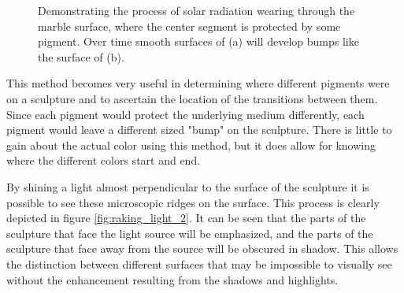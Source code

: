 \documentclass[10pt]{armath}
\begin{document}
\begin{figure}[htpb]
  \begin{center}
  \end{center}
  \caption{Demonstrating the process of solar radiation wearing through the
    marble surface, where the center segment is protected by some pigment. Over
  time smooth surfaces of (a) will develop bumps like the surface of (b).}
  \label{fig:raking_light_1}
\end{figure}

This method becomes very useful in determining where different pigments were on
a sculpture and to ascertain the location of the transitions between them.
Since each pigment would protect the underlying medium differently, each
pigment would leave a different sized "bump" on the sculpture. There is little
to gain about the actual color using this method, but it does allow for knowing
where the different colors start and end.

By shining a light almost perpendicular to the surface of the sculpture it is
possible to see these microscopic ridges on the surface. This process is
clearly depicted in figure \ref{fig:raking_light_2}. It can be seen that the
parts of the sculpture that face the light source will be emphasized, and the
parts of the sculpture that face away from the source will be obscured in
shadow. This allows the distinction between different surfaces that may be
impossible to visually see without the enhancement resulting from the shadows
and highlights.
\end{document}
